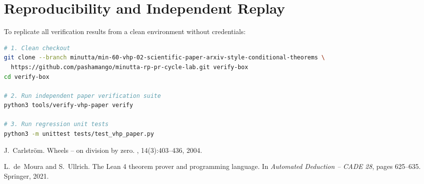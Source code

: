 \documentclass[11pt,a4paper]{article}
\theoremstyle{plain}
\theoremstyle{definition}
\theoremstyle{remark}
\begin{document}
\section{Reproducibility and Independent Replay}
\label{sec:reproducibility}

To replicate all verification results from a clean environment without credentials:

\begin{lstlisting}[language=bash,basicstyle=\ttfamily\small,breaklines=true,frame=single]
# 1. Clean checkout
git clone --branch minutta/min-60-vhp-02-scientific-paper-arxiv-style-conditional-theorems \
  https://github.com/pashamango/minutta-rp-pr-cycle-lab.git verify-box
cd verify-box

# 2. Run independent paper verification suite
python3 tools/verify-vhp-paper verify

# 3. Run regression unit tests
python3 -m unittest tests/test_vhp_paper.py
\end{lstlisting}


\begin{thebibliography}{99}
J.~Carlstr{\"o}m.
\newblock Wheels -- on division by zero.
, 14(3):403--436, 2004.

L.~de~Moura and S.~Ullrich.
\newblock The {L}ean 4 theorem prover and programming language.
\newblock In {\em Automated Deduction -- CADE 28}, pages 625--635. Springer, 2021.
\end{thebibliography}
\end{document}
